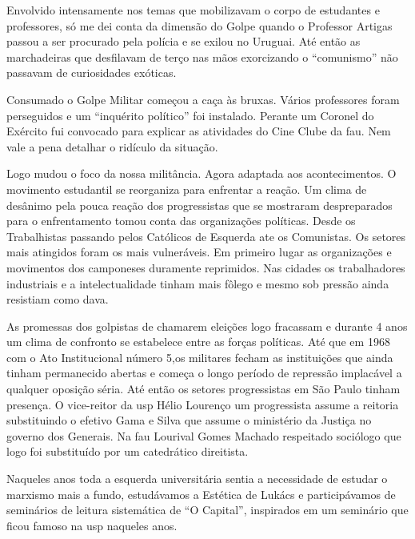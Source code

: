 Envolvido intensamente nos temas que mobilizavam o corpo de estudantes e
professores, só me dei conta da dimensão do Golpe quando o Professor
Artigas passou a ser procurado pela polícia e se exilou no Uruguai. Até
então as marchadeiras que desfilavam de terço nas mãos exorcizando o
“comunismo” não passavam de curiosidades exóticas.

\subject{O Golpe}

Consumado o Golpe Militar começou a caça às bruxas. Vários professores
foram perseguidos e um “inquérito político” foi instalado. Perante um
Coronel do Exército fui convocado para explicar as atividades do Cine
Clube da {\sc fau}. Nem vale a pena detalhar o ridículo da situação.

Logo mudou o foco da nossa militância. Agora adaptada aos
acontecimentos. O movimento estudantil se reorganiza para enfrentar a
reação. Um clima de desânimo pela pouca reação dos progressistas que se
mostraram despreparados para o enfrentamento tomou conta das
organizações políticas. Desde os Trabalhistas passando pelos Católicos
de Esquerda ate os Comunistas. Os setores mais atingidos foram os mais
vulneráveis. Em primeiro lugar as organizações e movimentos dos
camponeses duramente reprimidos. Nas cidades os trabalhadores
industriais e a intelectualidade tinham mais fôlego e mesmo sob pressão
ainda resistiam como dava.

As promessas dos golpistas de chamarem eleições logo fracassam e durante
4 anos um clima de confronto se estabelece entre as forças políticas.
Até que em 1968 com o Ato Institucional número 5,os militares fecham as
instituições que ainda tinham permanecido abertas e começa o longo
período de repressão implacável a qualquer oposição séria. Até então os
setores progressistas em São Paulo tinham presença. O vice-reitor da {\sc usp}
Hélio Lourenço um progressista assume a reitoria substituindo o efetivo
Gama e Silva que assume o ministério da Justiça no governo dos Generais.
Na {\sc fau} Lourival Gomes Machado respeitado sociólogo que logo foi
substituído por um catedrático direitista.

Naqueles anos toda a esquerda universitária sentia a necessidade de
estudar o marxismo mais a fundo, estudávamos a Estética de Lukács e
participávamos de seminários de leitura sistemática de “O Capital”,
inspirados em um seminário que ficou famoso na {\sc usp} naqueles anos.

